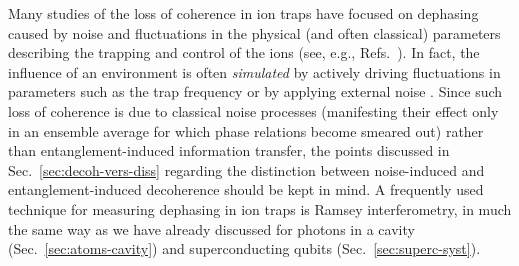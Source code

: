 \documentclass[3p,sort&compress,12pt]{elsarticle}
\begin{document}
Many studies of the loss of coherence in ion traps have focused on dephasing caused by noise and fluctuations in the physical (and often classical) parameters describing the trapping and control of the ions (see, e.g., Refs.~\cite{Turchette:2000:aa,Turchette:2000:oa,Brouard:2004:in,Grotz:2006:km,Stick:2006:aa,Seidelin:2006:rz,Haffner:2008:pp}). In fact, the influence of an environment is often \emph{simulated} by actively driving fluctuations in parameters such as the trap frequency or by applying external noise \cite{Myatt:2000:yy,Turchette:2000:aa}.  Since such loss of coherence is due to classical noise processes (manifesting their effect only in an ensemble average for which phase relations become smeared out) rather than entanglement-induced information transfer, the points discussed in Sec.~\ref{sec:decoh-vers-diss} regarding the distinction between noise-induced and entanglement-induced decoherence should be kept in mind. A frequently used technique for measuring dephasing in ion traps is Ramsey interferometry, in much the same way as we have already discussed for photons in a cavity (Sec.~\ref{sec:atoms-cavity}) and superconducting qubits (Sec.~\ref{sec:superc-syst}).
\end{document}
